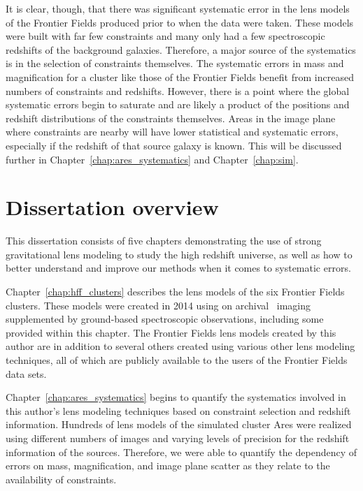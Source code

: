 It is clear, though, that there was significant systematic error in the lens models of the Frontier Fields produced prior to when the data were taken. These models were built with far few constraints and many only had a few spectroscopic redshifts of the background galaxies. Therefore, a major source of the systematics is in the selection of constraints themselves. The systematic errors in mass and magnification for a cluster like those of the Frontier Fields benefit from increased numbers of constraints and redshifts. However, there is a point where the global systematic errors begin to saturate and are likely a product of the positions and redshift distributions of the constraints themselves. Areas in the image plane where constraints are nearby will have lower statistical and systematic errors, especially if the redshift of that source galaxy is known. This will be discussed further in Chapter~\ref{chap:ares_systematics} and Chapter~\ref{chap:sim}.

\section{Dissertation overview}

This dissertation consists of five chapters demonstrating the use of strong gravitational lens modeling to study the high redshift universe, as well as how to better understand and improve our methods when it comes to systematic errors.

Chapter~\ref{chap:hff_clusters} describes the lens models of the six Frontier Fields clusters. These models were created in 2014 using on archival \hst\ imaging supplemented by ground-based spectroscopic observations, including some provided within this chapter. The Frontier Fields lens models created by this author are in addition to several others created using various other lens modeling techniques, all of which are publicly available to the users of the Frontier Fields data sets.

Chapter~\ref{chap:ares_systematics} begins to quantify the systematics involved in this author's lens modeling techniques based on constraint selection and redshift information. Hundreds of lens models of the simulated cluster Ares were realized using different numbers of images and varying levels of precision for the redshift information of the sources. Therefore, we were able to quantify the dependency of errors on mass, magnification, and image plane scatter as they relate to the availability of constraints.

